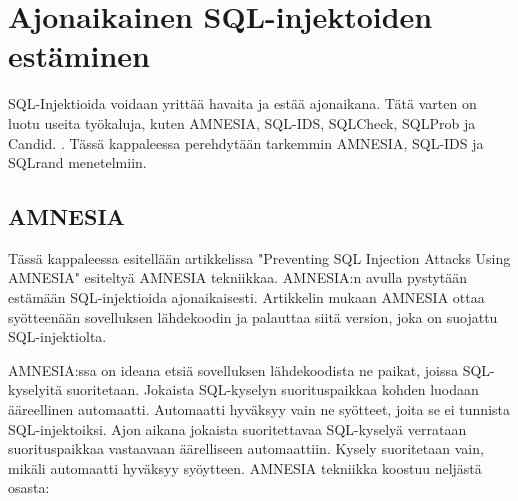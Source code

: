 \documentclass[finnish]{tktltiki2}
\theoremstyle{definition}
\theoremstyle{remark}
\begin{document}
	\section{Ajonaikainen SQL-injektoiden estäminen}
	SQL-Injektioida voidaan yrittää havaita ja estää ajonaikana. Tätä varten on luotu useita työkaluja, kuten AMNESIA, SQL-IDS, SQLCheck, SQLProb ja Candid. \cite{preventions}. Tässä kappaleessa perehdytään tarkemmin AMNESIA, SQL-IDS ja SQLrand menetelmiin.
	
	\subsection{AMNESIA}
	Tässä kappaleessa esitellään artikkelissa "Preventing SQL Injection Attacks Using AMNESIA"\space\cite{amnesia} esiteltyä AMNESIA tekniikkaa. AMNESIA:n avulla pystytään estämään SQL-injektioida ajonaikaisesti. Artikkelin mukaan AMNESIA ottaa syötteenään sovelluksen lähdekoodin ja palauttaa siitä version, joka on suojattu SQL-injektiolta.
	
	 AMNESIA:ssa on ideana etsiä sovelluksen lähdekoodista ne paikat, joissa SQL-kyselyitä suoritetaan. Jokaista SQL-kyselyn suorituspaikkaa kohden luodaan ääreellinen automaatti. Automaatti hyväksyy vain ne syötteet, joita se ei tunnista SQL-injektoiksi. Ajon aikana jokaista suoritettavaa SQL-kyselyä verrataan suorituspaikkaa vastaavaan äärelliseen automaattiin. Kysely suoritetaan vain, mikäli automaatti hyväksyy syöytteen. AMNESIA tekniikka koostuu neljästä osasta:
\end{document}
